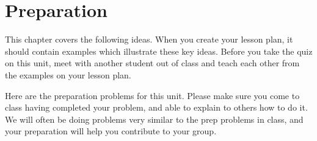 \section{Preparation}

\noindent 
This chapter covers the following ideas. When you create your lesson plan, it should contain examples which illustrate these key ideas. Before you take the quiz on this unit, meet with another student out of class and teach each other from the examples on your lesson plan. 



Here are the preparation problems for this unit. Please make sure you come to class having completed your problem, and able to explain to others how to do it.  We will often be doing problems very similar to the prep problems in class, and your preparation will help you contribute to your group. 





